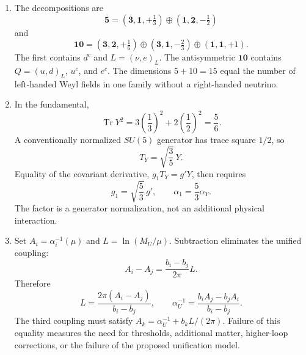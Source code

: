 \begin{enumerate}
  \begin{enumerate}
    \item[(a)]
    The decompositions are
    \[
      \boxed{\overline{\mathbf5}
        =(\overline{\mathbf3},\mathbf{1},+\tfrac13)
         \oplus(\mathbf{1},\mathbf2,-\tfrac12)}
    \]
    and
    \[
      \boxed{\mathbf{10}
        =(\mathbf3,\mathbf2,+\tfrac16)
         \oplus(\overline{\mathbf3},\mathbf{1},-\tfrac23)
         \oplus(\mathbf{1},\mathbf{1},+1).}
    \]
    The first contains \(d^c\) and \(L=(\nu,e)_L\).  The antisymmetric
    \(\mathbf{10}\) contains \(Q=(u,d)_L\), \(u^c\), and \(e^c\).
    The dimensions \(5+10=15\) equal the number of left-handed Weyl fields
    in one family without a right-handed neutrino.
    \item[(b)]
    In the fundamental,
    \[
      \operatorname{Tr}Y^2
        =3\left(\frac13\right)^2
         +2\left(\frac12\right)^2
        =\frac56.
    \]
    A conventionally normalized \(SU(5)\) generator has trace square
    \(1/2\), so
    \[
      T_Y=\sqrt{\frac35}\,Y.
    \]
    Equality of the covariant derivative,
    \(g_1T_Y=g'Y\), then requires
    \[
      \boxed{g_1=\sqrt{\frac53}\,g',
        \qquad \alpha_1=\frac53\alpha_Y.}
    \]
    The factor is a generator normalization, not an additional physical
    interaction.
    \item[(c)]
    Set \(A_i=\alpha_i^{-1}(\mu)\) and
    \(L=\ln(M_U/\mu)\).  Subtraction eliminates the unified coupling:
    \[
      A_i-A_j=\frac{b_i-b_j}{2\pi}L.
    \]
    Therefore
    \[
      \boxed{L=\frac{2\pi(A_i-A_j)}{b_i-b_j},\qquad
        \alpha_U^{-1}
         =\frac{b_iA_j-b_jA_i}{b_i-b_j}.}
    \]
    The third coupling must satisfy
    \(A_k=\alpha_U^{-1}+b_kL/(2\pi)\).  Failure of this equality measures
    the need for thresholds, additional matter, higher-loop corrections,
    or the failure of the proposed unification model.
  \end{enumerate}


\end{enumerate}
